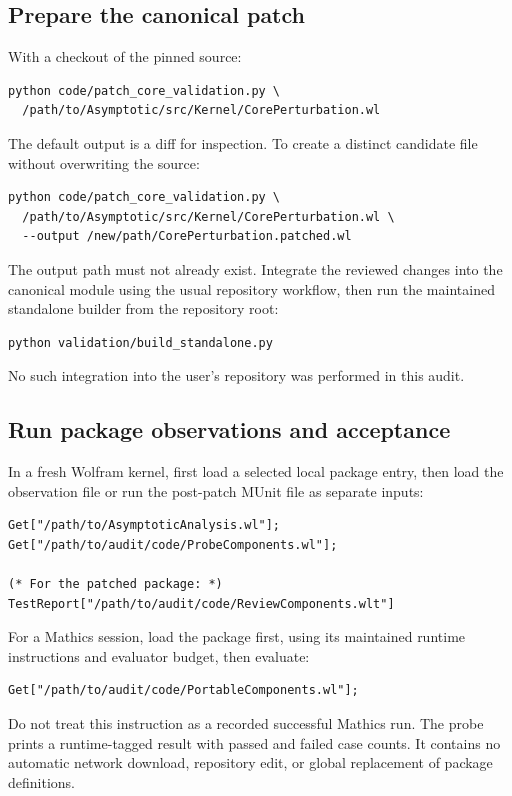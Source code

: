 \documentclass[11pt,letterpaper]{article}
\theoremstyle{remark}\newtheorem{remark}[theorem]{Remark}
\begin{document}
\subsection{Prepare the canonical patch}
With a checkout of the pinned source:
\begin{lstlisting}
python code/patch_core_validation.py \
  /path/to/Asymptotic/src/Kernel/CorePerturbation.wl
\end{lstlisting}
The default output is a diff for inspection. To create a distinct candidate
file without overwriting the source:
\begin{lstlisting}
python code/patch_core_validation.py \
  /path/to/Asymptotic/src/Kernel/CorePerturbation.wl \
  --output /new/path/CorePerturbation.patched.wl
\end{lstlisting}
The output path must not already exist. Integrate the reviewed changes into the
canonical module using the usual repository workflow, then run the maintained
standalone builder from the repository root:
\begin{lstlisting}
python validation/build_standalone.py
\end{lstlisting}
No such integration into the user's repository was performed in this audit.

\subsection{Run package observations and acceptance}
In a fresh Wolfram kernel, first load a selected local package entry, then
load the observation file or run the post-patch MUnit file as separate inputs:
\begin{lstlisting}
Get["/path/to/AsymptoticAnalysis.wl"];
Get["/path/to/audit/code/ProbeComponents.wl"];

(* For the patched package: *)
TestReport["/path/to/audit/code/ReviewComponents.wlt"]
\end{lstlisting}
For a Mathics session, load the package first, using its maintained runtime
instructions and evaluator budget, then evaluate:
\begin{lstlisting}
Get["/path/to/audit/code/PortableComponents.wl"];
\end{lstlisting}
Do not treat this instruction as a recorded successful Mathics run. The probe
prints a runtime-tagged result with passed and failed case counts. It contains
no automatic network download, repository edit, or global replacement of
package definitions.
\end{document}
